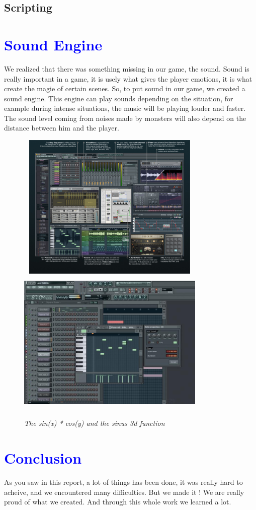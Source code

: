 \documentclass[article]{report}         %
\begin{document}
      \section{Scripting}
    \chapter{\textcolor{blue}{Sound Engine}}
	We realized that there was something missing in our game, the sound. Sound is really important in a game, it is usely what gives the player emotions, it is what create the magie of certain scenes.
	So, to put sound in our game, we created a sound engine. This engine can play sounds depending on the situation, for example during intense situations, the music will be playing louder and faster. The sound level coming from noises made by monsters will also depend on the distance between him and the player.
	
		\begin{figure}[h]
				\includegraphics[width=9cm, height=7cm]{images/FLStudio/1.JPG}
				\includegraphics[width=9cm, height=7cm]{images/FLStudio/2.JPG}
				\begin{center}\it The sin(x) * cos(y) and the sinus 3d function\end{center}
			\end{figure}
	
    \chapter{\textcolor{blue}{Conclusion}}
    	As you saw in this report, a lot of things has been done, it was really hard to acheive, and we encountered many difficulties. But we made it ! We are really proud of what we created. And through this whole work we learned a lot.
    
\end{document}
